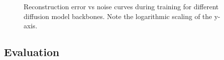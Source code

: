 \begin{figure}
    \centering

    
    \caption{Reconstruction error vs noise curves during training for different diffusion model backbones. Note the logarithmic scaling of the y-axis. }
    \label{fig:lossvsnoise}
\end{figure}



\subsection{Evaluation}

